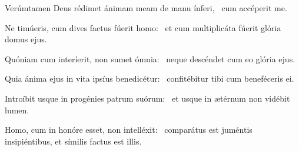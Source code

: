 \item Verúmtamen Deus rédimet ánimam meam de manu ínferi,~\psstar{} cum accéperit me.

\item Ne timúeris, cum dives factus fúerit homo:~\psstar{} et cum multiplicáta fúerit glória domus ejus.

\item Quóniam cum interíerit, non sumet ómnia:~\psstar{} neque descéndet cum eo glória ejus.

\item Quia ánima ejus in vita ipsíus benedicétur:~\psstar{} confitébitur tibi cum beneféceris ei.

\item Introíbit usque in progénies patrum suórum:~\psstar{} et usque in ætérnum non vidébit lumen.

\item Homo, cum in honóre esset, non intelléxit:~\psstar{} comparátus est juméntis insipiéntibus, et símilis factus est illis.